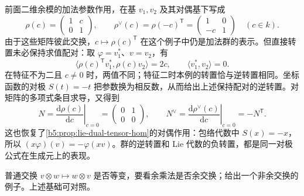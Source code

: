 \ProseParagraphBreak
前面二维余模的加法参数作用，在基 \(v_1,v_2\) 及其对偶基下写成
\[
	\rho(c)=\begin{pmatrix}1&c\\0&1\end{pmatrix},\qquad
	\rho^\vee(c)=\rho(-c)^{\mathsf T}
	=\begin{pmatrix}1&0\\-c&1\end{pmatrix}
	\quad(c\in k).
\]
由于这些矩阵彼此交换，\(c\mapsto\rho(c)^{\mathsf T}\) 在这个例子中仍是加法群的表示。但直接转置未必保持求值配对：取 \(\varphi=v_1^*\)、\(v=v_2\)，有
\[
	\bigl\langle\rho(c)^{\mathsf T}v_1^*,\rho(c)v_2\bigr\rangle=2c, \qquad \langle v_1^*,v_2\rangle=0.
\]
在特征不为二且 \(c\ne0\) 时，两值不同；特征二时本例的转置恰与逆转置相同。坐标函数的对极 \(S(t)=-t\) 把参数换为相反数，从而给出上述保持配对的逆转置。对矩阵的多项式条目求导，又得到
\[
	N=\left.\frac{\mathrm{d}\rho(c)}{\mathrm{d}c}\right|_{c=0}
	=\begin{pmatrix}0&1\\0&0\end{pmatrix},\qquad
	N^\vee=\left.\frac{\mathrm{d}\rho^\vee(c)}{\mathrm{d}c}\right|_{c=0} =-N^{\mathsf T}.
\]
这也恢复了\cref{b5:prop:lie-dual-tensor-hom}的对偶作用：包络代数中 \(S(x)=-x\)，所以 \((x\varphi)(v)=-\varphi(xv)\)。群的逆转置和 Lie 代数的负转置，都是同一对极公式在生成元上的表现。

\ProseParagraphBreak
普通交换 \(v\otimes w\mapsto w\otimes v\) 是否等变，要看余乘法是否余交换；给出一个非余交换的例子。上述基础可对照\cite[Definitions 5.2.2, 5.3.2; Propositions 5.3.5--5.3.6; Corollary 5.3.7]{EtingofEtAl2015TensorCategories}。
